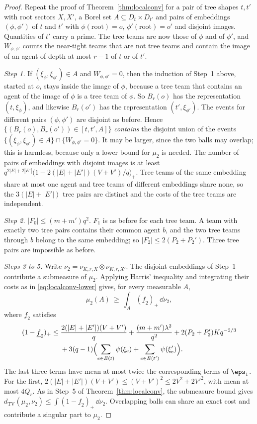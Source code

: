 \begin{proof}
Repeat the proof of Theorem~\ref{thm:localconv} for a pair of tree shapes $t,t'$ with root
sectors $X,X'$, a Borel set $A\subseteq D_t\times D_{t'}$ and pairs of embeddings
$(\phi,\phi')$ of $t$ and $t'$ with $\phi(\text{root})=o$, $\phi'(\text{root})=o'$ and
disjoint images. Quantities of $t'$ carry a prime. The tree teams are now those of $\phi$
and of $\phi'$, and $W_{\phi,\phi'}$ counts the near-tight teams that are not tree teams and
contain the image of an agent of depth at most $r-1$ of $t$ or of $t'$.

\emph{Step 1.} If $(\xi_\phi,\xi_{\phi'})\in A$ and $W_{\phi,\phi'}=0$, then the induction
of Step~1 above, started at $o$, stays inside the image of $\phi$, because a tree team that
contains an agent of the image of $\phi$ is a tree team of $\phi$. So $B_r(o)$ has the
representation $(t,\xi_\phi)$, and likewise $B_r(o')$ has the representation
$(t',\xi_{\phi'})$. The events for different pairs $(\phi,\phi')$ are disjoint as before.
Hence $\{(B_r(o),B_r(o'))\in[t,t',A]\}$ \emph{contains} the disjoint union of the events
$\{(\xi_\phi,\xi_{\phi'})\in A\}\cap\{W_{\phi,\phi'}=0\}$. It may be larger, since the two
balls may overlap; this is harmless, because only a lower bound for $\mu_2$ is needed. The
number of pairs of embeddings with disjoint images is at least
$q^{2|E|+2|E'|}\bigl(1-2(|E|+|E'|)(V+V')/q\bigr)_+$. Tree teams of the same embedding share
at most one agent and tree teams of different embeddings share none, so the $3(|E|+|E'|)$
tree pairs are distinct and the costs of the tree teams are independent.

\emph{Step 2.} $|F_0|\le(m+m')q^2$. $F_1$ is as before for each tree team. A team with
exactly two tree pairs contains their common agent $b$, and the two tree teams through $b$
belong to the same embedding; so $|F_2|\le2(P_2+P_2')$. Three tree pairs are impossible as
before.

\emph{Steps 3 to 5.} Write $\nu_2=\nu_{K,r,X}\otimes\nu_{K,r,X'}$. The disjoint
embeddings of Step~1 contribute a submeasure of $\mu_2$. Applying Harris' inequality and
integrating their costs as in \eqref{eq:localconv-lower} gives, for every measurable $A$,
\[
\mu_2(A)\ \ge\ \int_A(\underline f_2)_+\,\dd\nu_2,
\]
where $\underline f_2$ satisfies
\begin{align*}
(1-\underline f_2)_+\le{}&\frac{2(|E|+|E'|)(V+V')}{q}+\frac{(m+m')\lambda^2}{q^2}
+2(P_2+P_2')Kq^{-2/3}\\
&+3(q-1)\Bigl(\sum_{e\in E(t)}\psi(\xi_e)+\sum_{e\in E(t')}\psi(\xi'_e)\Bigr).
\end{align*}
The last three terms have mean at most twice the corresponding terms of $\eps_1$. For the
first, $2(|E|+|E'|)(V+V')\le(V+V')^2\le2V^2+2V'^2$, with mean at most $4Q_r$.
As in Step~5 of Theorem~\ref{thm:localconv}, the submeasure bound gives
$d_{\mathrm{TV}}(\mu_2,\nu_2)\le\int(1-\underline f_2)_+\,\dd\nu_2$.
Overlapping balls can share an exact cost and contribute a singular part to $\mu_2$.
\end{proof}

